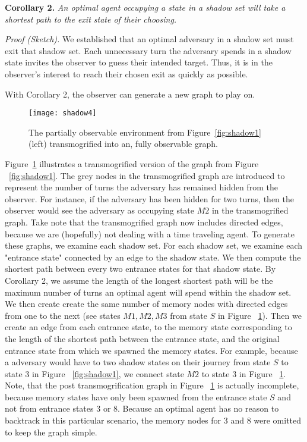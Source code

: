 \textbf{Corollary 2.} \textit{An optimal agent occupying a state in a shadow set will take a shortest path to the exit state of their choosing.} 

\textit{Proof (Sketch).} We established that an optimal adversary in a shadow set must exit that shadow set. Each unnecessary turn the adversary spends in a shadow state invites the observer to guess their intended target. Thus, it is in the observer's interest to reach their chosen exit as quickly as possible.

With Corollary 2, the observer can generate a new graph to play on.

\begin{figure}[h!]
\begin{center}

  \texttt{[image: shadow4]}
  \end{center}

  \caption{The partially observable environment from Figure~\ref{fig:shadow1} (left) transmogrified into an, fully observable graph.}
  
  \label{fig:shadow4}
\end{figure}

Figure~\ref{fig:shadow4} illustrates a transmogrified version of the graph from Figure ~\ref{fig:shadow1}. The grey nodes in the transmogrified graph are introduced to represent the number of turns the adversary has remained hidden from the observer. For instance, if the adversary has been hidden for two turns, then the observer would see the adversary as occupying state $M2$ in the transmogrified graph. Take note that the transmogrified graph now includes directed edges, because we are (hopefully) not dealing with a time traveling agent. To generate these graphs, we examine each shadow set. For each shadow set, we examine each "entrance state" connected by an edge to the shadow state. We then compute the shortest path between every two entrance states for that shadow state. By Corollary 2, we assume the length of the longest shortest path will be the maximum number of turns an optimal agent will spend within the shadow set. We then create create the same number of memory nodes with directed edges from one to the next (see states $M1, M2, M3$ from state $S$ in Figure ~\ref{fig:shadow4}). Then we create an edge from each entrance state, to the memory state corresponding to the length of the shortest path between the entrance state, and the original entrance state from which we spawned the memory states. For example, because a adversary would have to two shadow states on their journey from state $S$ to state $3$ in Figure ~\ref{fig:shadow1}, we connect state $M2$ to state $3$ in Figure ~\ref{fig:shadow4}. Note, that the post transmogrification graph in Figure ~\ref{fig:shadow4} is actually incomplete, because memory states have only been spawned from the entrance state $S$ and not from entrance states $3$ or $8$. Because an optimal agent has no reason to backtrack in this particular scenario, the memory nodes for $3$ and $8$ were omitted to keep the graph simple.

